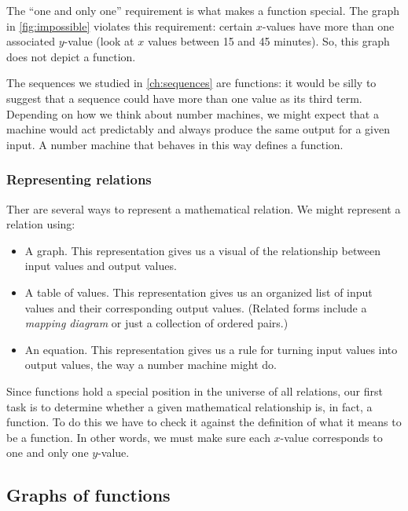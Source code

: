 The ``one and only one'' requirement is what makes a function special. The graph in \cref{fig:impossible} violates this requirement: certain $x$-values have more than one associated $y$-value (look at $x$ values between 15 and 45 minutes). So, this graph does not depict a function.

The sequences we studied in \cref{ch:sequences} are functions: it would be silly to suggest that a sequence could have more than one value as its third term. Depending on how we think about number machines, we might expect that a machine would act predictably and always produce the same output for a given input. A number machine that behaves in this way defines a function.

\subsubsection{Representing relations}

Ther are several ways to represent a mathematical relation. We might represent a relation using:
\begin{itemize}
\item A graph. This representation gives us a visual of the relationship between input values and output values.
\item A table of values. This representation gives us an organized list of input values and their corresponding output values. (Related forms include a \textit{mapping diagram} or just a collection of ordered pairs.)
\item An equation. This representation gives us a rule for turning input values into output values, the way a number machine might do.
\end{itemize}

Since functions hold a special position in the universe of all relations, our first task is to determine whether a given mathematical relationship is, in fact, a function. To do this we have to check it against the definition of what it means to be a function. In other words, we must make sure each $x$-value corresponds to one and only one $y$-value.


\subsection{Graphs of functions}

